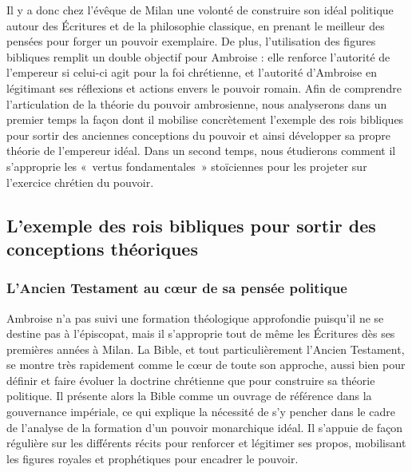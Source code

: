 \bigskip

Il y a donc chez l'évêque de Milan une volonté de construire son idéal politique autour des Écritures et de la philosophie classique, en prenant le meilleur des pensées pour forger un pouvoir exemplaire. De plus, l'utilisation des figures bibliques remplit un double objectif pour Ambroise : elle renforce l'autorité de l'empereur si celui-ci agit pour la foi chrétienne, et l'autorité d'Ambroise en légitimant ses réflexions et actions envers le pouvoir romain. Afin de comprendre l'articulation de la théorie du pouvoir ambrosienne, nous analyserons dans un premier temps la façon dont il mobilise concrètement l'exemple des rois bibliques pour sortir des anciennes conceptions du pouvoir et ainsi développer sa propre théorie de l'empereur idéal. Dans un second temps, nous étudierons comment il s'approprie les «~vertus fondamentales~» stoïciennes pour les projeter sur l'exercice chrétien du pouvoir.

\bigskip

\subsection{L’exemple des rois bibliques pour sortir des conceptions théoriques}

\subsubsection{L’Ancien Testament au cœur de sa pensée politique}

Ambroise n'a pas suivi une formation théologique approfondie puisqu'il ne se destine pas à l'épiscopat, mais il s'approprie tout de même les Écritures dès ses premières années à Milan. La Bible, et tout particulièrement l'Ancien Testament, se montre très rapidement comme le cœur de toute son approche, aussi bien pour définir et faire évoluer la doctrine chrétienne que pour construire sa théorie politique. Il présente alors la Bible comme un ouvrage de référence dans la gouvernance impériale, ce qui explique la nécessité de s'y pencher dans le cadre de l'analyse de la formation d'un pouvoir monarchique idéal. Il s'appuie de façon régulière sur les différents récits pour renforcer et légitimer ses propos, mobilisant les figures royales et prophétiques pour encadrer le pouvoir.

\bigskip

